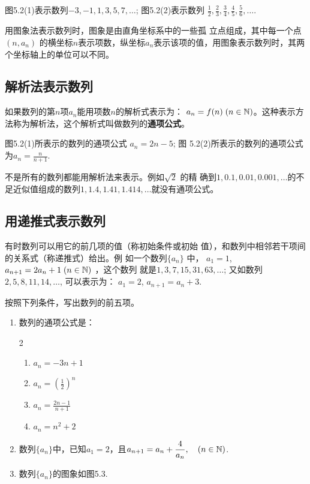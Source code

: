 图5.2(1)表示数列$-3,-1,1,3,5,7,\ldots$; 图5.2(2)表示数列
$\frac{1}{2},\frac{2}{3},\frac{3}{4},\frac{4}{5},\frac{5}{6},\ldots$.

用图象法表示数列时，图象是由直角坐标系中的一些孤
立点组成，其中每一个点$(n,a_n)$
的横坐标$n$表示项数，纵坐标$a_n$表示该项的值，用图象表示数列时，其两个坐标轴上的单位可以不同。

\subsection{解析法表示数列}
如果数列的第$n$项$a_n$能用项数$n$的解析式表示为：
$a_n=f(n)\; (n\in\mathbb{N})$。这种表示方法称为解析法，这个解析式叫做数列的\textbf{通项公式}。

图5.2(1)所表示的数列的通项公式
$a_n=2n-5$; 图
5.2(2)所表示的数列的通项公式为$a_n=\frac{n}{n+1}$.

不是所有的数列都能用解析法来表示。例如$\sqrt{2}$
的精
确到$1,0.1,0.01,0.001,\ldots$的不足近似值组成的数列$1,
1.4,1.41,1.414,\ldots$就没有通项公式。

\subsection{用递推式表示数列}
有时数列可以用它的前几项的值（称初始条件或初始
值），和数列中相邻若干项间的关系式（称递推式）给出。例
如一个数列$\{a_n\}$
中，
$a_1=1$,
$a_{n+1}=2a_{n}+1\; (n\in\mathbb{N})$
，这个数列
就是$1,3,7,15,31,63,\ldots$; 又如数列$2,5,8,11,14,
\ldots$, 可以表示为：
$a_1=2$, $a_{n+1}=a_n+3$.

\begin{ex}
    按照下列条件，写出数列的前五项。
\begin{enumerate}
    \item 数列的通项公式是：
\begin{multicols}{2}
\begin{enumerate}[(1)]
    \item $a_n=-3n+1$
    \item $a_n=\left(\frac{1}{2}\right)^n$
    \item $a_n=\frac{2n-1}{n+1}$
    \item $a_n=n^2+2$
\end{enumerate}    
\end{multicols}
\item 数列$\{a_n\}$中，已知$a_1=2$，且$a_{n+1}=a_n+\dfrac{4}{a_n},\quad (n\in\mathbb{N})$.
\item 数列$\{a_n\}$的图象如图5.3.
\end{enumerate}
\end{ex}

